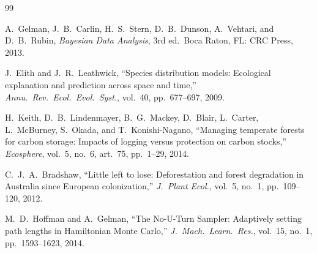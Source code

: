 \begin{thebibliography}{99}

A.\ Gelman, J.\ B.\ Carlin, H.\ S.\ Stern, D.\ B.\ Dunson, A.\ Vehtari, and
D.\ B.\ Rubin,
\textit{Bayesian Data Analysis}, 3rd ed.\ Boca Raton, FL: CRC Press, 2013.

J.\ Elith and J.\ R.\ Leathwick,
\enquote{Species distribution models: Ecological explanation and prediction
across space and time,}
\textit{Annu.\ Rev.\ Ecol.\ Evol.\ Syst.}, vol.\ 40, pp.\ 677--697, 2009.

H.\ Keith, D.\ B.\ Lindenmayer, B.\ G.\ Mackey, D.\ Blair, L.\ Carter,
L.\ McBurney, S.\ Okada, and T.\ Konishi-Nagano,
\enquote{Managing temperate forests for carbon storage: Impacts of logging
versus protection on carbon stocks,}
\textit{Ecosphere}, vol.\ 5, no.\ 6, art.\ 75, pp.\ 1--29, 2014.

C.\ J.\ A.\ Bradshaw,
\enquote{Little left to lose: Deforestation and forest degradation in
Australia since European colonization,}
\textit{J.\ Plant Ecol.}, vol.\ 5, no.\ 1, pp.\ 109--120, 2012.

M.\ D.\ Hoffman and A.\ Gelman,
\enquote{The No-U-Turn Sampler: Adaptively setting path lengths in Hamiltonian
Monte Carlo,}
\textit{J.\ Mach.\ Learn.\ Res.}, vol.\ 15, no.\ 1, pp.\ 1593--1623, 2014.

\end{thebibliography}
